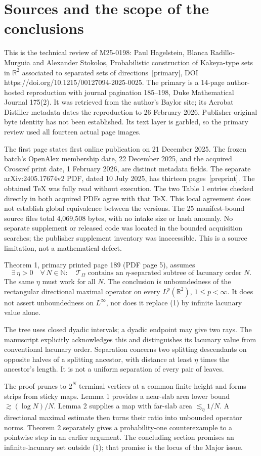 \documentclass[10pt]{article}
\begin{document}
\section*{Sources and the scope of the conclusions}
This is the technical review of M25-0198: Paul Hagelstein, Blanca Radillo-Murguia and Alexander Stokolos, Probabilistic construction of Kakeya-type sets in \(\mathbb R^2\) associated to separated sets of directions [primary], DOI https://doi.org/10.1215/00127094-2025-0025. The primary is a 14-page author-hosted reproduction with journal pagination 185–198, Duke Mathematical Journal 175(2). It was retrieved from the author’s Baylor site; its Acrobat Distiller metadata dates the reproduction to 26 February 2026. Publisher-original byte identity has not been established. Its text layer is garbled, so the primary review used all fourteen actual page images.\par
The first page states first online publication on 21 December 2025. The frozen batch’s OpenAlex membership date, 22 December 2025, and the acquired Crossref print date, 1 February 2026, are distinct metadata fields. The separate arXiv:2405.17674v2 PDF, dated 10 July 2025, has thirteen pages [preprint]. The obtained TeX was fully read without execution. The two Table 1 entries checked directly in both acquired PDFs agree with that TeX. This local agreement does not establish global equivalence between the versions. The 25 manifest-bound source files total 4,069,508 bytes, with no intake size or hash anomaly. No separate supplement or released code was located in the bounded acquisition searches; the publisher supplement inventory was inaccessible. This is a source limitation, not a mathematical defect.\par
Theorem 1, primary printed page 189 (PDF page 5), assumes \[\exists\,\eta>0\quad\forall\,N\in\mathbb N:
 \quad \mathcal T_\Omega\text{ contains an }\eta\text{-separated
 subtree of lacunary order }N.
 \tag{1}\] The same \(\eta\) must work for all \(N\). The conclusion is unboundedness of the rectangular directional maximal operator on every \(L^p(\mathbb R^2)\), \(1\le p<\infty\). It does not assert unboundedness on \(L^\infty\), nor does it replace (1) by infinite lacunary value alone.\par
The tree uses closed dyadic intervals; a dyadic endpoint may give two rays. The manuscript explicitly acknowledges this and distinguishes its lacunary value from conventional lacunary order. Separation concerns two splitting descendants on opposite halves of a splitting ancestor, with distance at least \(\eta\) times the ancestor’s length. It is not a uniform separation of every pair of leaves.\par
The proof prunes to \(2^N\) terminal vertices at a common finite height and forms strips from sticky maps. Lemma 1 provides a near-slab area lower bound \(\gtrsim(\log N)/N\). Lemma 2 supplies a map with far-slab area \(\lesssim_\eta 1/N\). A directional maximal estimate then turns their ratio into unbounded operator norms. Theorem 2 separately gives a probability-one counterexample to a pointwise step in an earlier argument. The concluding section promises an infinite-lacunary set outside (1); that promise is the locus of the Major issue.\par
\end{document}
